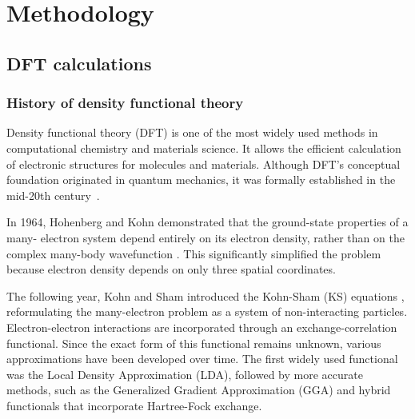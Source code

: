 
\chapter{Methodology}

\label{Chapter3} 


\newcommand{\keyword}[1]{\textbf{#1}}
\newcommand{\tabhead}[1]{\textbf{#1}}
\newcommand{\code}[1]{\texttt{#1}}
\newcommand{\file}[1]{\texttt{\bfseries#1}}
\newcommand{\option}[1]{\texttt{\itshape#1}}

\section{DFT calculations}

\subsection{History of density functional theory}

Density functional theory (DFT) is one of the most widely used methods in computational chemistry and materials science. It allows the efficient calculation of electronic structures for molecules and materials. Although DFT's conceptual foundation originated in quantum mechanics, it was formally established in the mid-20th century~\cite{DFT_Origins}.

In 1964, Hohenberg and Kohn demonstrated that the ground-state properties of a many- electron system depend entirely on its electron density, rather than on the complex many-body wavefunction \cite{Hohen_Kohn}. This significantly simplified the problem because electron density depends on only three spatial coordinates.

The following year, Kohn and Sham introduced the Kohn-Sham (KS) equations \cite{Kohn_KS_equations}, reformulating the many-electron problem as a system of non-interacting particles. Electron-electron interactions are incorporated through an exchange-correlation functional. Since the exact form of this functional remains unknown, various approximations have been developed over time. The first widely used functional was the Local Density Approximation (LDA), followed by more accurate methods, such as the Generalized Gradient Approximation (GGA) and hybrid functionals that incorporate Hartree-Fock exchange.

